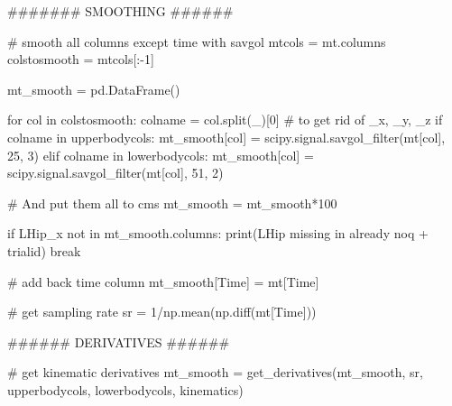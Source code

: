 \documentclass[
  letterpaper,
  DIV=11,
  numbers=noendperiod]{scrreprt}
\newenvironment{Shaded}{\begin{snugshade}}{\end{snugshade}}
\newcommand{\BuiltInTok}[1]{\textcolor[rgb]{0.00,0.23,0.31}{#1}}
\newcommand{\CommentTok}[1]{\textcolor[rgb]{0.37,0.37,0.37}{#1}}
\newcommand{\ControlFlowTok}[1]{\textcolor[rgb]{0.00,0.23,0.31}{#1}}
\newcommand{\DecValTok}[1]{\textcolor[rgb]{0.68,0.00,0.00}{#1}}
\newcommand{\KeywordTok}[1]{\textcolor[rgb]{0.00,0.23,0.31}{#1}}
\newcommand{\NormalTok}[1]{\textcolor[rgb]{0.00,0.23,0.31}{#1}}
\newcommand{\OperatorTok}[1]{\textcolor[rgb]{0.37,0.37,0.37}{#1}}
\newcommand{\StringTok}[1]{\textcolor[rgb]{0.13,0.47,0.30}{#1}}
\begin{document}
\begin{Shaded}
\begin{Highlighting}[]
    \CommentTok{\#\#\#\#\#\#\# SMOOTHING \#\#\#\#\#\#}

    \CommentTok{\# smooth all columns except time with savgol}
\NormalTok{    mtcols }\OperatorTok{=}\NormalTok{ mt.columns}
\NormalTok{    colstosmooth }\OperatorTok{=}\NormalTok{ mtcols[:}\OperatorTok{{-}}\DecValTok{1}\NormalTok{]}

\NormalTok{    mt\_smooth }\OperatorTok{=}\NormalTok{ pd.DataFrame()}

    \ControlFlowTok{for}\NormalTok{ col }\KeywordTok{in}\NormalTok{ colstosmooth:}
\NormalTok{        colname }\OperatorTok{=}\NormalTok{ col.split(}\StringTok{\textquotesingle{}\_\textquotesingle{}}\NormalTok{)[}\DecValTok{0}\NormalTok{] }\CommentTok{\# to get rid of \_x, \_y, \_z}
        \ControlFlowTok{if}\NormalTok{ colname }\KeywordTok{in}\NormalTok{ upperbodycols:}
\NormalTok{            mt\_smooth[col] }\OperatorTok{=}\NormalTok{ scipy.signal.savgol\_filter(mt[col], }\DecValTok{25}\NormalTok{, }\DecValTok{3}\NormalTok{)}
        \ControlFlowTok{elif}\NormalTok{ colname }\KeywordTok{in}\NormalTok{ lowerbodycols:}
\NormalTok{            mt\_smooth[col] }\OperatorTok{=}\NormalTok{ scipy.signal.savgol\_filter(mt[col], }\DecValTok{51}\NormalTok{, }\DecValTok{2}\NormalTok{)}

    \CommentTok{\# And put them all to cms}
\NormalTok{    mt\_smooth }\OperatorTok{=}\NormalTok{ mt\_smooth}\OperatorTok{*}\DecValTok{100}

    \ControlFlowTok{if} \StringTok{\textquotesingle{}LHip\_x\textquotesingle{}} \KeywordTok{not} \KeywordTok{in}\NormalTok{ mt\_smooth.columns:}
        \BuiltInTok{print}\NormalTok{(}\StringTok{\textquotesingle{}LHip missing in already noq \textquotesingle{}} \OperatorTok{+}\NormalTok{ trialid)}
        \ControlFlowTok{break}

    \CommentTok{\# add back time column}
\NormalTok{    mt\_smooth[}\StringTok{\textquotesingle{}Time\textquotesingle{}}\NormalTok{] }\OperatorTok{=}\NormalTok{ mt[}\StringTok{\textquotesingle{}Time\textquotesingle{}}\NormalTok{]}

    \CommentTok{\# get sampling rate}
\NormalTok{    sr }\OperatorTok{=} \DecValTok{1}\OperatorTok{/}\NormalTok{np.mean(np.diff(mt[}\StringTok{\textquotesingle{}Time\textquotesingle{}}\NormalTok{]))}

    \CommentTok{\#\#\#\#\#\# DERIVATIVES \#\#\#\#\#\#}

    \CommentTok{\# get kinematic derivatives}
\NormalTok{    mt\_smooth }\OperatorTok{=}\NormalTok{ get\_derivatives(mt\_smooth, sr, upperbodycols, lowerbodycols, }\StringTok{\textquotesingle{}kinematics\textquotesingle{}}\NormalTok{)}


\end{Highlighting}
\end{Shaded}
\end{document}
